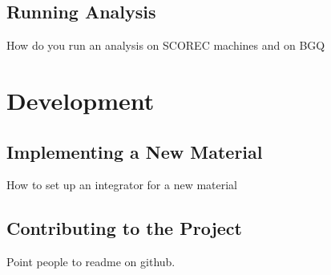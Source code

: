 \documentclass[12pt]{book}
\begin{document}
\section{Running Analysis}
How do you run an analysis on SCOREC machines and on BGQ
\chapter{Development}
\section{Implementing a New Material}
How to set up an integrator for a new material
\section{Contributing to the Project}
Point people to readme on github.

\appendix



\clearpage


\end{document}
